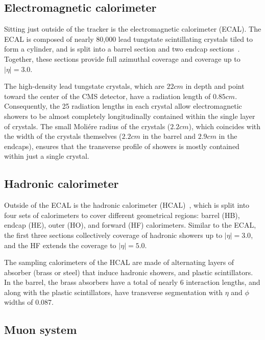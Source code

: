 
\subsection{Electromagnetic calorimeter}

Sitting just outside of the tracker is the electromagnetic calorimeter (ECAL).
The ECAL is composed of nearly 80,000 lead tungstate scintillating crystals tiled to form a cylinder,
and is split into a barrel section and two endcap sections~\cite{CMS:Khachatryan2015hwa}.
Together, these sections provide full azimuthal coverage and coverage up to $|\eta|=3.0$.

The high-density lead tungstate crystals, which are $22\unit{cm}$ in depth
and point toward the center of the CMS detector,
have a radiation length of $0.85\unit{cm}$. Consequently, the 25 radiation
lengths in each crystal allow electromagnetic showers to be almost completely
longitudinally contained within the single layer of crystals. The small
Moli\'ere radius of the crystals ($2.2\unit{cm}$), which coincides with the
width of the crystals themselves ($2.2\unit{cm}$ in the barrel and
$2.9\unit{cm}$ in the endcaps), ensures that the transverse profile of
showers is mostly contained within just a single crystal.

\subsection{Hadronic calorimeter}

Outside of the ECAL is the hadronic calorimeter (HCAL)~\cite{CMS:PTDR2},
which is split into four sets of calorimeters to cover different geometrical
regions: barrel (HB), endcap (HE), outer (HO), and forward (HF) calorimeters.
Similar to the ECAL, the first three sections collectively coverage of hadronic showers 
up to $|\eta|=3.0$, and the HF extends the coverage to $|\eta|=5.0$.

The sampling calorimeters of the HCAL are made of alternating layers of
absorber (brass or steel) that induce hadronic showers, and plastic
scintillators. In the barrel, the brass absorbers have a total of nearly 6
interaction lengths, and along with the plastic scintillators, have
transverse segmentation with $\eta$ and $\phi$ widths of 0.087.

\subsection{Muon system}

